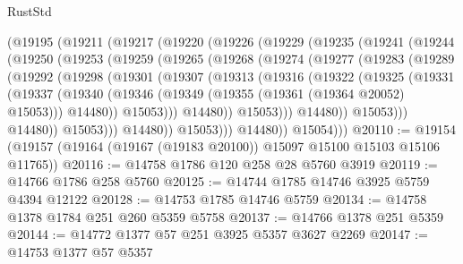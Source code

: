 \begin{lexlean}{RustStd}
\begin{coremodule}
    (@19195
      (@19211
        (@19217
          (@19220
            (@19226
              (@19229
                (@19235
                  (@19241
                    (@19244
                      (@19250
                        (@19253
                          (@19259
                            (@19265
                              (@19268
                                (@19274
                                  (@19277
                                    (@19283
                                      (@19289
                                        (@19292
                                          (@19298
                                            (@19301
                                              (@19307
                                                (@19313
                                                  (@19316
                                                    (@19322
                                                      (@19325
                                                        (@19331
                                                          (@19337
                                                            (@19340
                                                              (@19346
                                                                (@19349
                                                                  (@19355
                                                                    (@19361
                                                                      (@19364 @20052)
                                                                      @15053)))
                                                                @14480))
                                                            @15053)))
                                                      @14480))
                                                  @15053)))
                                            @14480))
                                        @15053)))
                                  @14480))
                              @15053)))
                        @14480))
                    @15053)))
              @14480))
          @15054)))
@20110 := @19154 (@19157 (@19164 (@19167 (@19183 @20100)) @15097 @15100 @15103 @15106 @11765))
@20116 := @14758 @1786 @120 @258 @28 @5760 @3919
@20119 := @14766 @1786 @258 @5760
@20125 := @14744 @1785 @14746 @3925 @5759 @4394 @12122
@20128 := @14753 @1785 @14746 @5759
@20134 := @14758 @1378 @1784 @251 @260 @5359 @5758
@20137 := @14766 @1378 @251 @5359
@20144 := @14772 @1377 @57 @251 @3925 @5357 @3627 @2269
@20147 := @14753 @1377 @57 @5357

\end{coremodule}
\end{lexlean}
